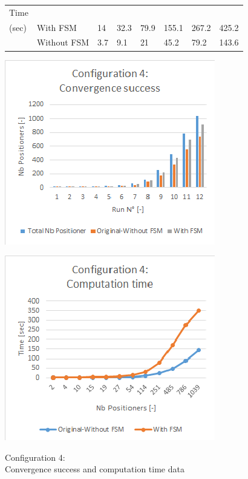 \documentclass[]{spie}  %
\begin{document}
\begin{figure}[H]
\begin{minipage}{8.7cm}
{\begin{tabular}{|l|l|l|l|l|l|l|l|}
				\hline
				Time\\(sec) & With FSM  & 14 & 32.3  & 79.9 & 155.1 & 267.2 & 425.2 \\
				\cline{2-8}
				& Without FSM  & 3.7  & 9.1 & 21 & 45.2 & 79.2  & 143.6 \\
				\hline
			\end{tabular}
			}
			\label{configuration3_result} 
		\end{minipage}
		\begin{minipage}{9cm}
			\begin{minipage}[t]{4.2cm}
				\includegraphics[scale=0.56]{images/configuration4_conv}
				\label{configuration1_conv}
			\end{minipage}
			\begin{minipage}[t]{1.0cm}
				\includegraphics[scale=0.56]{images/configuration4_time}
				\label{configuration1_time}
			\end{minipage}
			\caption{\centering Configuration 4:\\
				Convergence success and computation time data
}
\end{minipage}
\end{figure}
\end{document}

